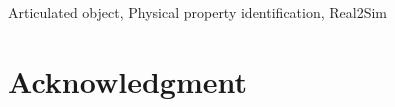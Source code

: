 \documentclass[conference]{IEEEtran}
\newcommand{\rev}[1]{\textcolor{red}{#1}}
\begin{document}
\begin{abstract}
\end{abstract}

\begin{IEEEkeywords}
Articulated object, Physical property identification, Real2Sim
\end{IEEEkeywords}







\section*{Acknowledgment}

\begingroup
{}


\endgroup
\end{document}
